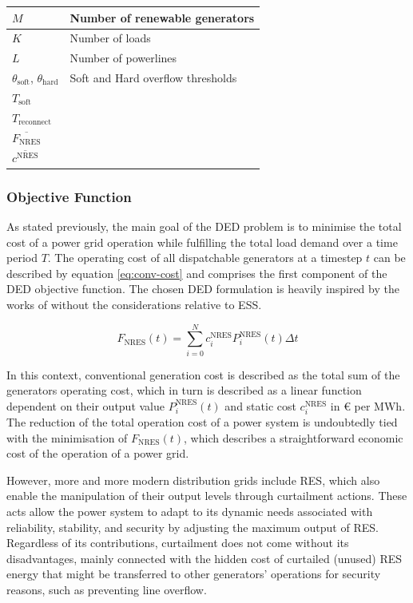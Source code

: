 \begin{center}
\begin{tabular}{ | m{2cm} | m{10cm}| }
		\hline
		$M$ & Number of renewable generators \\
		\hline
		$K$ & Number of loads \\
		\hline
		$L$ & Number of powerlines \\
		\hline
		$\theta_\text{soft}$,  $\theta_\text{hard}$ & Soft and Hard overflow thresholds \\
		\hline
		$T_\text{soft}$ & \\
		\hline
		$T_\text{reconnect}$ & \\
		\hline 
		$\overline{F_\text{NRES}}$ & \\
		\hline 
		$\overline{c^\text{NRES}}$ & \\
		\hline
	\end{tabular}
\end{center}

\subsubsection{Objective Function} \label{sec:objective-func}

As stated previously, the main goal of the \ac{DED} problem is to minimise the total cost of a power grid operation while fulfilling the total load demand over a time period $T$. The operating cost of all dispatchable generators at a timestep $t$ can be described by equation \ref{eq:conv-cost} and comprises the first component of the \ac{DED} objective function. The chosen \ac{DED} formulation is heavily inspired by the works of \cite{chenScalableGraphReinforcement2023, liNovelGraphReinforcement2022, liNovelGraphReinforcement2022} without the considerations relative to \ac{ESS}. \par

\begin{equation} \label{eq:conv-cost}
	F_\text{NRES}(t) = \sum^N_{i=0} c^\text{NRES}_i P^\text{NRES}_i(t) \Delta t
\end{equation}

In this context, conventional generation cost is described as the total sum of the generators operating cost, which in turn is described as a linear function dependent on their output value $P^\text{NRES}_i(t)$ and static cost $c^\text{NRES}_i$ in € per MWh. The reduction of the total operation cost of a power system is undoubtedly tied with the minimisation of $F_\text{NRES}(t)$, which describes a straightforward economic cost of the operation of a power grid. \par

However, more and more modern distribution grids include \acf{RES}, which also enable the manipulation of their output levels through curtailment actions. These acts allow the power system to adapt to its dynamic needs associated with reliability, stability, and security by adjusting the maximum output of \ac{RES}. Regardless of its contributions, curtailment does not come without its disadvantages, mainly connected with the hidden cost of curtailed (unused) \ac{RES} energy that might be transferred to other generators' operations for security reasons, such as preventing line overflow. \par

